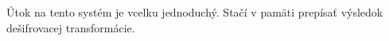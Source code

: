 Útok na tento systém je vcelku jednoduchý. Stačí v pamäti prepísať výsledok dešifrovacej transformácie. 



